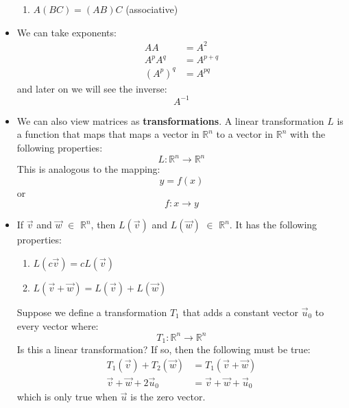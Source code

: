 \begin{itemize}
\begin{enumerate}
        \item $A(BC)=(AB)C$ (associative)
    \end{enumerate}
    \item We can take exponents:
    \begin{align}
        AA&=A^2\\ 
        A^pA^q &= A^{p+q} \\ 
        \left(A^{p}\right)^q &= A^{pq}
        \label{eq:}
    \end{align}
    and later on we will see the inverse:
    \begin{equation}
        A^{-1}
        \label{eq:}
    \end{equation}
    \item We can also view matrices as \textbf{transformations}. A linear transformation $L$ is a function that maps that maps a vector in $\mathbb{R}^n$ to a vector in $\mathbb{R}^n$ with the following properties:
    \begin{equation}
        L:\mathbb{R}^n \to \mathbb{R}^n
        \label{eq:}
    \end{equation}
    This is analogous to the mapping:
    \begin{equation}
        y=f(x)
        \label{eq:}
    \end{equation}
    or
    \begin{equation}
        f:x\to y
        \label{eq:}
    \end{equation}
    \item If $\vec{v}$ and $\vec{w}$ $\in$ $\mathbb{R}^n$, then $L(\vec{v})$ and $L(\vec{w})$ $\in$ $\mathbb{R}^n$. It has the following properties:
    \begin{enumerate}
        \item $L(c\vec{v})=cL(\vec{v})$
        \item $L(\vec{v}+\vec{w})=L(\vec{v})+L(\vec{w})$
    \end{enumerate}
    \begin{example}
        Suppose we define a transformation $T_1$ that adds a constant vector $\vec{u}_0$ to every vector where:
        \begin{equation}
            T_1: \mathbb{R}^n \to \mathbb{R}^n
            \label{eq:}
        \end{equation}
        Is this a linear transformation? If so, then the following must be true:
        \begin{align}
            T_1(\vec{v})+T_2(\vec{w})&=T_1(\vec{v}+\vec{w}) \\ 
            \vec{v}+\vec{w}+2\vec{u}_0&=\vec{v}+\vec{w}+\vec{u}_0
        \end{align}
        which is only true when $\vec{u}$ is the zero vector.
    \end{example}
\end{itemize}